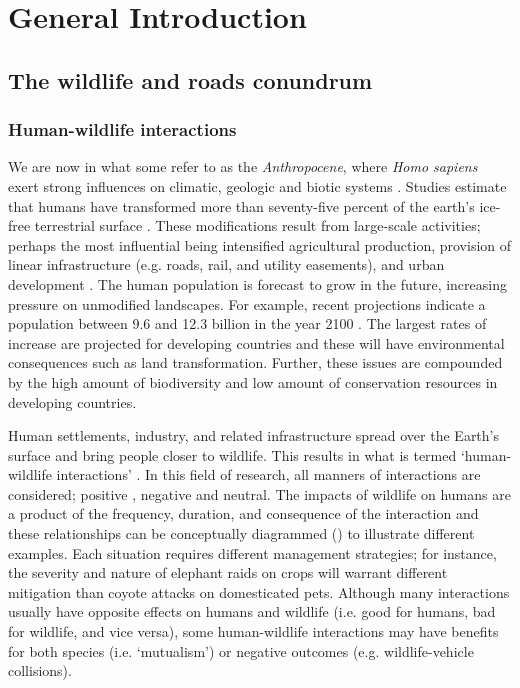 \chapter{General Introduction}\label{sec:intro}
\newpage

\section{The wildlife and roads conundrum}

\subsection{Human-wildlife interactions}

We are now in what some refer to as the \textit{Anthropocene}, where \textit{Homo sapiens} exert strong influences on climatic, geologic and biotic systems \citep{crut06}. Studies estimate that humans have transformed more than seventy-five percent of the earth's ice-free terrestrial surface \citep[e.g.][]{elli08}. These modifications result from large-scale activities; perhaps the most influential being intensified agricultural production, provision of linear infrastructure (e.g. roads, rail, and utility easements), and urban development \citep{vito97,sand02,fole05}. The human population is forecast to grow in the future, increasing pressure on unmodified landscapes. For example, recent projections indicate a population between 9.6 and 12.3 billion in the year 2100 \citep{gerl14}. The largest rates of increase are projected for developing countries and these will have environmental consequences such as land transformation. Further, these issues are compounded by the high amount of biodiversity and low amount of conservation resources in developing countries. 

Human settlements, industry, and related infrastructure spread over the Earth's surface and bring people closer to wildlife. This results in what is termed `human-wildlife interactions' \citep[see][]{manf08}. In this field of research, all manners of interactions are considered; positive \citep{dall12}, negative \citep{jone99} and neutral. The impacts of wildlife on humans are a product of the frequency, duration, and consequence of the interaction and these relationships can be conceptually diagrammed () to illustrate different examples. Each situation requires different management strategies; for instance, the severity and nature of elephant raids on crops will warrant different mitigation than coyote attacks on domesticated pets. Although many interactions usually have opposite effects on humans and wildlife (i.e. good for humans, bad for wildlife, and vice versa), some human-wildlife interactions may have benefits for both species (i.e. `mutualism') or negative outcomes (e.g. wildlife-vehicle collisions).

